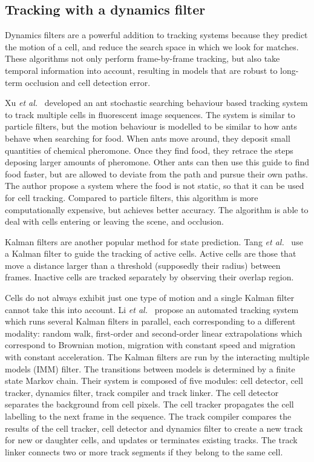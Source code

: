 \subsection{Tracking with a dynamics filter \statusfirstdraft}
Dynamics filters are a powerful addition to tracking systems because they predict the motion of a cell, and reduce the search space in which we look for matches. These algorithms not only perform frame-by-frame tracking, but also take temporal information into account, resulting in models that are robust to long-term occlusion and cell detection error.

Xu \emph{et al.}~\cite{xu12} developed an ant stochastic searching behaviour based tracking system to track multiple cells in fluorescent image sequences. The system is similar to particle filters, but the motion behaviour is modelled to be similar to how ants behave when searching for food. When ants move around, they deposit small quantities of chemical pheromone. Once they find food, they retrace the steps deposing larger amounts of pheromone. Other ants can then use this guide to find food faster, but are allowed to deviate from the path and pursue their own paths. The author propose a system where the food is not static, so that it can be used for cell tracking. Compared to particle filters, this algorithm is more computationally expensive, but achieves better accuracy. The algorithm is able to deal with cells entering or leaving the scene, and occlusion.

Kalman filters are another popular method for state prediction. Tang \emph{et al.}~\cite{tang} use a Kalman filter to guide the tracking of active cells. Active cells are those that move a distance larger than a threshold (supposedly their radius) between frames. Inactive cells are tracked separately by observing their overlap region.

Cells do not always exhibit just one type of motion and a single Kalman filter cannot take this into account. Li \emph{et al.}~\cite{li07} propose an automated tracking system which runs several Kalman filters in parallel, each corresponding to a different modality: random walk, first-order and second-order linear extrapolations which correspond to Brownian motion, migration with constant speed and migration with constant acceleration. The Kalman filters are run by the interacting multiple models (IMM) filter. The transitions between models is determined by a finite state Markov chain. Their system is composed of five modules: cell detector, cell tracker, dynamics filter, track compiler and track linker. The cell detector separates the background from cell pixels. The cell tracker propagates the cell labelling to the next frame in the sequence. The track compiler compares the results of the cell tracker, cell detector and dynamics filter to create a new track for new or daughter cells, and updates or terminates existing tracks. The track linker connects two or more track segments if they belong to the same cell.

